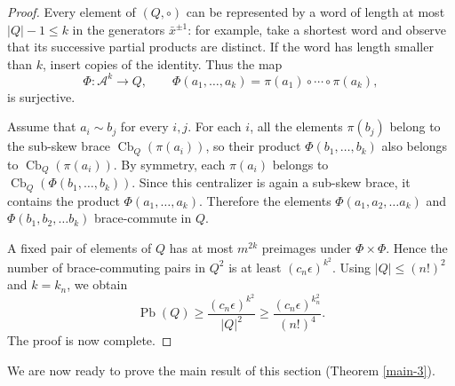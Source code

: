 \documentclass[11pt, oneside]{amsart}
\numberwithin{equation}{section}
\theoremstyle{plain}
\theoremstyle{definition}
\newcommand{\Cb}{\operatorname{Cb} }
\newcommand{\Pb}{\operatorname{Pb} }
\begin{document}
\begin{proof}
Every element of $(Q,\circ)$ can be represented by a word of length at most
$|Q|-1\leqslant k$ in the generators $\bar x^{\pm1}$: for example, take a
shortest word and observe that its successive partial products are distinct.
If the word has length smaller than $k$, insert copies of the identity.
Thus the map
$$
\Phi:\mathcal A^k\longrightarrow Q,\qquad
\Phi(a_1,\ldots,a_k)=\pi(a_1)\circ\cdots\circ\pi(a_k),
$$
is surjective.

Assume that $a_i\sim b_j$ for every $i,j$. For each $i$, all the elements
$\pi(b_j)$ belong to the sub-skew brace $\Cb_Q(\pi(a_i))$, so their product
$\Phi(b_1,\ldots,b_k)$ also belongs to $\Cb_Q(\pi(a_i))$. By symmetry,
each $\pi(a_i)$ belongs to
$\Cb_Q(\Phi(b_1,\ldots,b_k))$. Since this centralizer is again a sub-skew
brace, it contains the product $\Phi(a_1,\ldots,a_k)$. Therefore the elements $\Phi(a_1, a_2, \ldots a_k)$ and $\Phi(b_1, b_2, \ldots b_k)$  brace-commute in $Q$.

A fixed pair of elements of $Q$ has at most $m^{2k}$ preimages under
$\Phi\times\Phi$. Hence the number of brace-commuting pairs in $Q^2$ is at
least $(c_n\epsilon)^{k^2}$. Using $|Q|\leqslant(n!)^2$ and $k=k_n$, we obtain
$$
\Pb(Q)\geqslant\frac{(c_n\epsilon)^{k^2}}{|Q|^2}
\geqslant\frac{(c_n\epsilon)^{k_n^2}}{(n!)^4}.
$$
The proof is now complete.
\end{proof}

We are now ready to prove the main result of this section (Theorem \ref{main-3}).
\end{document}

